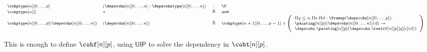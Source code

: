 \documentclass{msc}
\newcommand{\unittype}{\ensuremath{\mathsf{unit}}}
\newcommand{\unitpoint}{\ensuremath{\ast}}
\newcommand{\defeq}{\ensuremath{\triangleq}}
\newcommand{\UIP}{\textsf{UIP}}
\begin{document}
\begin{equation*}
  \fontsize{7.2}{9}\selectfont
  \begin{array}{llcl}
    \cohptype[n][0,...,p]                    & (\depscohs[n][0,...,n]:\depscohstype[n][0,...,n]) & :      & \U                                        \\
    \cohptype[n][]                           & \unitpoint                                & \defeq & \unittype                                 \\
    \cohptype[n][0,...,p](\depscohs[n][0,...,n]) & (\depscohs[n][0,...,n])                       & \defeq & \cohptype[n+1][0,...,p-1] \times \left(
    \begin{array}{l}
        \Pi q\leq n.\Pi \epsilon.\Pi d:\framep(\depscohs[n][0,...,p]). \\
        \painting[n][p](\depscohs[n][0,...,n])(d) \rightarrow          \\ \depscohs.\painting[n][p](\depscohs.\restrf[n][p][q][\epsilon](d))\end{array}
    \right)                                                                                                                                     \\
  \end{array}
\end{equation*}

This is enough to define $\cohf[n][p]$, using $\UIP$ to solve the dependency in $\coht[n][p]$.
\end{document}
